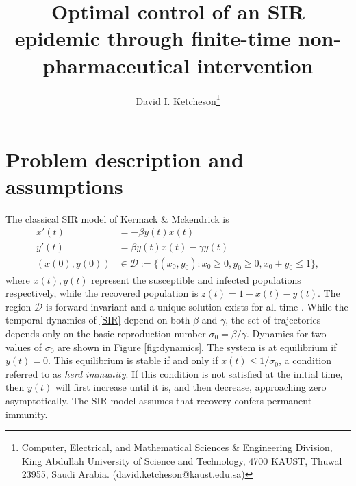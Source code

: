 \documentclass[english,12pt]{article}
\newcommand{\Rnot}{\sigma_0}
\newcommand{\dom}{{\mathcal D}}
\begin{document}
\title{Optimal control of an SIR epidemic through finite-time non-pharmaceutical intervention}
\author{
  David I. Ketcheson\thanks{Computer, Electrical, and Mathematical Sciences \& Engineering Division,
King Abdullah University of Science and Technology, 4700 KAUST, Thuwal
23955, Saudi Arabia. (david.ketcheson@kaust.edu.sa)}
}
\maketitle


\section{Problem description and assumptions}
The classical SIR model of Kermack \& Mckendrick \cite{kermack1927contribution} is
\begin{subequations} \label{SIR}
\begin{align} 
    x'(t) & = -\beta y(t) x(t) \label{eq:x} \\
    y'(t) & = \beta y(t) x(t) - \gamma y(t) \label{eq:y} \\
    (x(0),y(0)) & \in \dom := \{(x_0,y_0) : x_0 \ge 0, y_0\ge 0, x_0+y_0 \le 1\},
\end{align}
\end{subequations}
where $x(t), y(t)$ represent the susceptible and infected populations
respectively, while the recovered population is $z(t)=1-x(t)-y(t)$.  The region
$\dom$ is forward-invariant and a unique solution exists for all time
\cite{hethcote2000mathematics}.  While
the temporal dynamics of \eqref{SIR} depend on both $\beta$ and $\gamma$, the set
of trajectories depends only on the basic reproduction number 
$\Rnot = \beta/\gamma$.  Dynamics for two values of $\Rnot$ are
shown in Figure \ref{fig:dynamics}.  The system
is at equilibrium if $y(t)=0$.  This equilibrium is stable if and
only if $x(t)\le 1/\Rnot$, a condition referred to as {\em herd immunity}.  If
this condition is not satisfied at
the initial time, then $y(t)$ will first increase until it is, and then decrease,
approaching zero asymptotically.  The SIR model assumes that recovery
confers permanent immunity.
\end{document}
